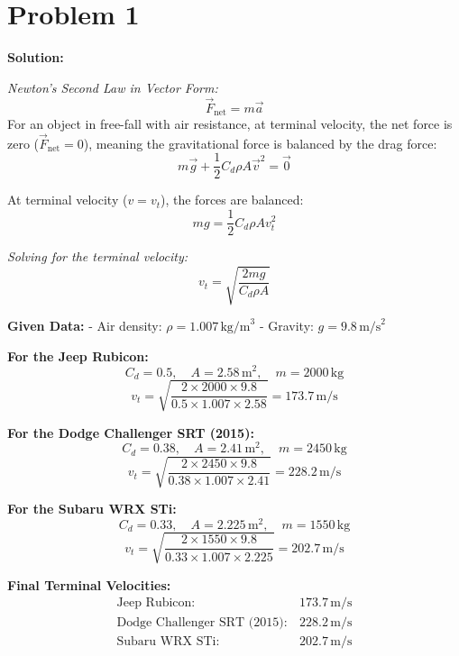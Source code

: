 \section{Problem 1}

\textbf{Solution:}

\textit{Newton's Second Law in Vector Form:}
\[
\vec{F}_{\text{net}} = m\vec{a}
\]
For an object in free-fall with air resistance, at terminal velocity, the net force is zero (\(\vec{F}_{\text{net}} = 0\)), meaning the gravitational force is balanced by the drag force:
\[
m\vec{g} + \frac{1}{2} C_d \rho A \vec{v}^2 = \vec{0}
\]

At terminal velocity (\( v = v_t \)), the forces are balanced:
\[
mg = \frac{1}{2} C_d \rho A v_t^2
\]

\textit{Solving for the terminal velocity:}
\[
v_t = \sqrt{\frac{2mg}{C_d \rho A}}
\]

\textbf{Given Data:}
- Air density: \( \rho = 1.007 \, \text{kg/m}^3 \)
- Gravity: \( g = 9.8 \, \text{m/s}^2 \)

\textbf{For the Jeep Rubicon:}
\[
C_d = 0.5, \quad A = 2.58 \, \text{m}^2, \quad m = 2000 \, \text{kg}
\]
\[
v_t = \sqrt{\frac{2 \times 2000 \times 9.8}{0.5 \times 1.007 \times 2.58}} = 173.7 \, \text{m/s}
\]

\textbf{For the Dodge Challenger SRT (2015):}
\[
C_d = 0.38, \quad A = 2.41 \, \text{m}^2, \quad m = 2450 \, \text{kg}
\]
\[
v_t = \sqrt{\frac{2 \times 2450 \times 9.8}{0.38 \times 1.007 \times 2.41}} = 228.2 \, \text{m/s}
\]

\textbf{For the Subaru WRX STi:}
\[
C_d = 0.33, \quad A = 2.225 \, \text{m}^2, \quad m = 1550 \, \text{kg}
\]
\[
v_t = \sqrt{\frac{2 \times 1550 \times 9.8}{0.33 \times 1.007 \times 2.225}} = 202.7 \, \text{m/s}
\]

\textbf{Final Terminal Velocities:}
\begin{align*}
\text{Jeep Rubicon}: & \, \boxed{173.7 \, \text{m/s}} \\
\text{Dodge Challenger SRT (2015)}: & \, \boxed{228.2 \, \text{m/s}} \\
\text{Subaru WRX STi}: & \, \boxed{202.7 \, \text{m/s}}
\end{align*}